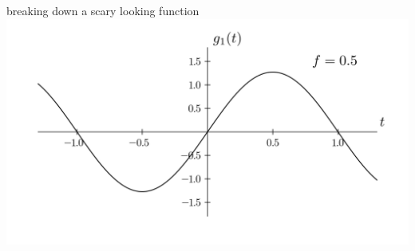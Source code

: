 \documentclass{beamer}
\begin{document}
	\begin{frame}{breaking down a scary looking function}
		\includegraphics[width=\linewidth,height=0.85\textheight,keepaspectratio]{../assets/first-term-function.png}
	\end{frame}
	
\end{document}
